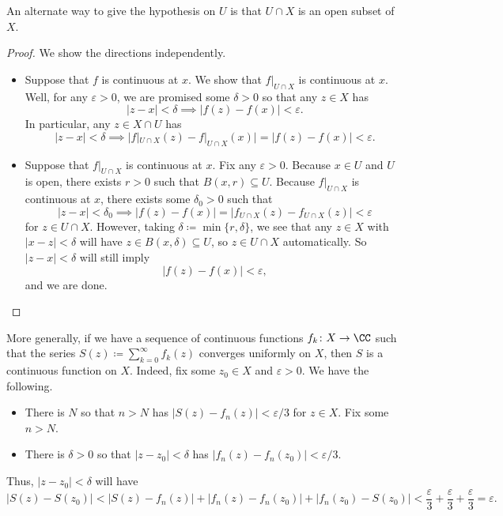An alternate way to give the hypothesis on $U$ is that $U\cap X$ is an open subset of $X$.
\begin{proof}
	We show the directions independently.
	\begin{itemize}
		\item Suppose that $f$ is continuous at $x$. We show that $f|_{U\cap X}$ is continuous at $x$. Well, for any $\varepsilon>0$, we are promised some $\delta>0$ so that any $z\in X$ has
		\[|z-x|<\delta\implies|f(z)-f(x)|<\varepsilon.\]
		In particular, any $z\in X\cap U$ has
		\[|z-x|<\delta\implies\big|f|_{U\cap X}(z)-f|_{U\cap X}(x)\big|=|f(z)-f(x)|<\varepsilon.\]
		\item Suppose that $f|_{U\cap X}$ is continuous at $x$. Fix any $\varepsilon>0$. Because $x\in U$ and $U$ is open, there exists $r>0$ such that $B(x,r)\subseteq U$. Because $f|_{U\cap X}$ is continuous at $x$, there exists some $\delta_0>0$ such that
		\[|z-x|<\delta_0\implies|f(z)-f(x)|=|f_{U\cap X}(z)-f_{U\cap X}(z)|<\varepsilon\]
		for $z\in U\cap X$. However, taking $\delta\coloneqq \min\{r,\delta\}$, we see that any $z\in X$ with $|x-z|<\delta$ will have $z\in B(x,\delta)\subseteq U$, so $z\in U\cap X$ automatically. So $|z-x|<\delta$ will still imply
		\[|f(z)-f(x)|<\varepsilon,\]
		and we are done.
		\qedhere
	\end{itemize}
\end{proof}
\begin{remark}[Nir] \label{rem:continuousseries}
	More generally, if we have a sequence of continuous functions $f_k\colon X\to\CC$ such that the series $S(z)\coloneqq \sum_{k=0}^\infty f_k(z)$ converges uniformly on $X$, then $S$ is a continuous function on $X$. Indeed, fix some $z_0\in X$ and $\varepsilon>0$. We have the following.
	\begin{itemize}
		\item There is $N$ so that $n>N$ has $|S(z)-f_n(z)|<\varepsilon/3$ for $z\in X$. Fix some $n>N$.
		\item There is $\delta>0$ so that $|z-z_0|<\delta$ has $|f_n(z)-f_n(z_0)|<\varepsilon/3$. 
	\end{itemize}
	Thus, $|z-z_0|<\delta$ will have
	\[|S(z)-S(z_0)|<|S(z)-f_n(z)|+|f_n(z)-f_n(z_0)|+|f_n(z_0)-S(z_0)|<\frac\varepsilon3+\frac\varepsilon3+\frac\varepsilon3=\varepsilon.\]
\end{remark}